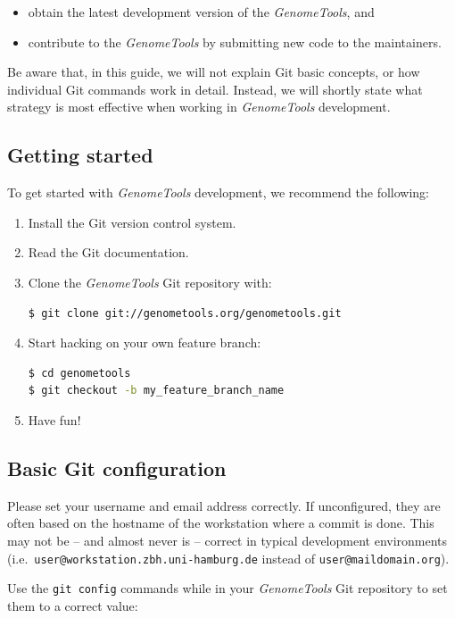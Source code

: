 \documentclass[11pt,final]{article}
\newcommand{\keyword}[1]{\lstinline{#1}}
\newcommand{\Gt}[0]{\emph{GenomeTools}\xspace}
\begin{document}
\begin{itemize}
\item
obtain the latest development version of the \Gt , and
\item
contribute to the \Gt by submitting new code to the maintainers.
\end{itemize}

Be aware that, in this guide, we will not explain Git basic concepts, or how
individual Git commands work in detail. Instead, we will shortly state what
strategy is most effective when working in \Gt development.

\subsection{Getting started}
To get started with \Gt development, we recommend the following:
\begin{enumerate}
  \item Install the Git version control system.
  \item Read the Git documentation.
  \item Clone the \Gt Git repository with:
    \begin{lstlisting}[language=sh]
$ git clone git://genometools.org/genometools.git
    \end{lstlisting}%

  \item Start hacking on your own feature branch:
    \begin{lstlisting}[language=sh]
$ cd genometools
$ git checkout -b my_feature_branch_name
    \end{lstlisting}
   \item Have fun!
\end{enumerate}

\subsection{Basic Git configuration}

Please set your username and email address correctly. If unconfigured, they are
often based on the hostname of the workstation where a commit is done. This may
not be -- and almost never is --  correct in typical development environments
(i.e.\ \keyword{user@workstation.zbh.uni-hamburg.de} instead of
\keyword{user@maildomain.org}).

Use the \keyword{git config} commands while in your \Gt Git repository to set
them to a correct value:
\end{document}
